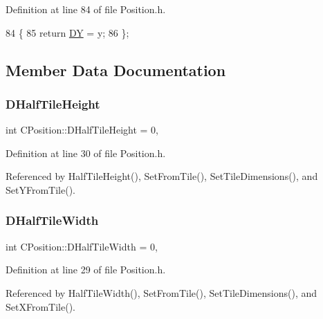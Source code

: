 Definition at line 84 of file Position.\+h.


\begin{DoxyCode}
84                     \{
85             \textcolor{keywordflow}{return} \hyperlink{classCPosition_a84139c9e8eb547e7cf3cb851739943a4}{DY} = y;
86         \};
\end{DoxyCode}


\subsection{Member Data Documentation}
\hypertarget{classCPosition_a1e0af68f7690b3cfc14687cf7fbe7ade}{}\label{classCPosition_a1e0af68f7690b3cfc14687cf7fbe7ade} 
\subsubsection{\texorpdfstring{D\+Half\+Tile\+Height}{DHalfTileHeight}}
{\footnotesize\ttfamily int C\+Position\+::\+D\+Half\+Tile\+Height = 0\hspace{0.3cm}{\ttfamily [static]}, {\ttfamily [protected]}}



Definition at line 30 of file Position.\+h.



Referenced by Half\+Tile\+Height(), Set\+From\+Tile(), Set\+Tile\+Dimensions(), and Set\+Y\+From\+Tile().

\hypertarget{classCPosition_a3227e835d9008346e9d91bdad2380f14}{}\label{classCPosition_a3227e835d9008346e9d91bdad2380f14} 
\subsubsection{\texorpdfstring{D\+Half\+Tile\+Width}{DHalfTileWidth}}
{\footnotesize\ttfamily int C\+Position\+::\+D\+Half\+Tile\+Width = 0\hspace{0.3cm}{\ttfamily [static]}, {\ttfamily [protected]}}



Definition at line 29 of file Position.\+h.



Referenced by Half\+Tile\+Width(), Set\+From\+Tile(), Set\+Tile\+Dimensions(), and Set\+X\+From\+Tile().


